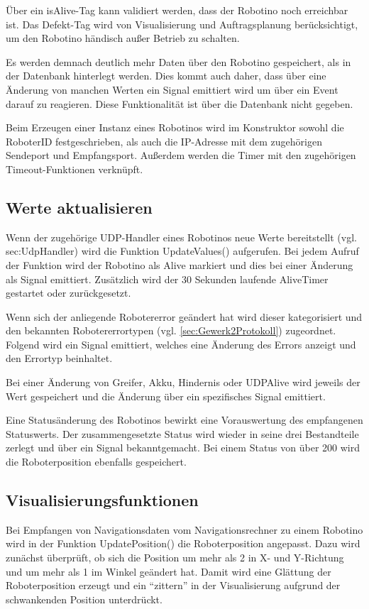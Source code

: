 Über ein isAlive-Tag kann validiert werden, dass der Robotino noch erreichbar ist. Das Defekt-Tag wird von Visualisierung und Auftragsplanung berücksichtigt, um den Robotino händisch außer Betrieb zu schalten. 

Es werden demnach deutlich mehr Daten über den Robotino gespeichert, als in der Datenbank hinterlegt werden. Dies kommt auch daher, dass über eine Änderung von manchen Werten ein Signal emittiert wird um über ein Event darauf zu reagieren. Diese Funktionalität ist über die Datenbank nicht gegeben. 

Beim Erzeugen einer Instanz eines Robotinos wird im Konstruktor sowohl die RoboterID festgeschrieben, als auch die IP-Adresse mit dem zugehörigen Sendeport und Empfangsport. Außerdem werden die Timer mit den zugehörigen Timeout-Funktionen verknüpft.

\subsection{Werte aktualisieren}

Wenn der zugehörige UDP-Handler eines Robotinos neue Werte bereitstellt (vgl. sec:UdpHandler) wird die Funktion UpdateValues() aufgerufen. Bei jedem Aufruf der Funktion wird der Robotino als Alive markiert und dies bei einer Änderung als Signal emittiert. Zusätzlich wird der 30 Sekunden laufende AliveTimer gestartet oder zurückgesetzt. 

Wenn sich der anliegende Robotererror geändert hat wird dieser kategorisiert und den bekannten Robotererrortypen (vgl. \ref{sec:Gewerk2Protokoll}) zugeordnet. Folgend wird ein Signal emittiert, welches eine Änderung des Errors anzeigt und den Errortyp beinhaltet.

Bei einer Änderung von Greifer, Akku, Hindernis oder UDPAlive wird jeweils der Wert gespeichert und die Änderung über ein spezifisches Signal emittiert. 

Eine Statusänderung des Robotinos bewirkt eine Vorauswertung des empfangenen Statuswerts. Der zusammengesetzte Status wird wieder in seine drei Bestandteile zerlegt und über ein Signal bekanntgemacht. Bei einem Status von über 200 wird die Roboterposition ebenfalls gespeichert. 

\subsection{Visualisierungsfunktionen}

Bei Empfangen von Navigationsdaten vom Navigationsrechner zu einem Robotino wird in der Funktion UpdatePosition() die Roboterposition angepasst. Dazu wird zunächst überprüft, ob sich die Position um mehr als 2 in X- und Y-Richtung und um mehr als 1 im Winkel geändert hat. Damit wird eine Glättung der Roboterposition erzeugt und ein "`zittern"' in der Visualisierung aufgrund der schwankenden Position unterdrückt. 

